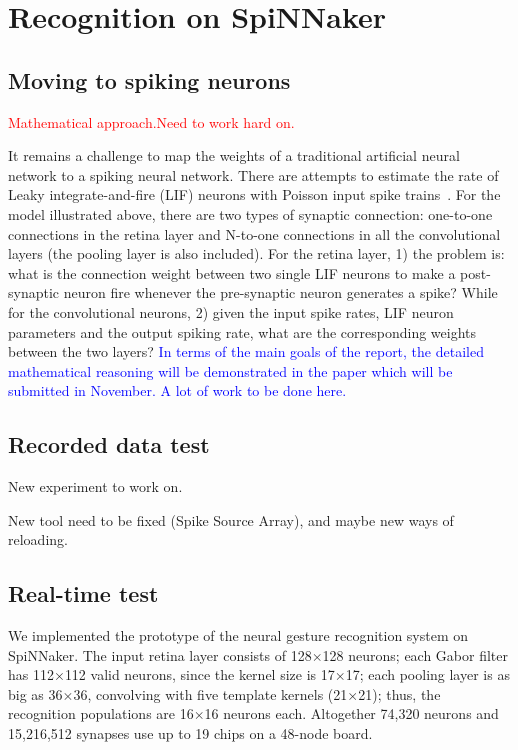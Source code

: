 \chapter{Recognition on SpiNNaker}
\label{cha:rsp}

\section{Moving to spiking neurons}
\label{sec:msn}
\textcolor{red}{Mathematical approach.Need to work hard on.}

It remains a challenge to map the weights of a traditional artificial neural network to a spiking neural network. 
There are attempts to estimate the rate of Leaky integrate-and-fire (LIF) neurons with Poisson input spike trains~\cite{la2008response}. 
For the model illustrated above, there are two types of synaptic connection: one-to-one connections in the retina layer and N-to-one connections in all the convolutional layers (the pooling layer is also included). 
For the retina layer, 1) the problem is: what is the connection weight between two single LIF neurons to make a post-synaptic neuron fire whenever the pre-synaptic neuron generates a spike? 
While for the convolutional neurons, 2) given the input spike rates, LIF neuron parameters and the output spiking rate, what are the corresponding weights between the two layers?
\textcolor{blue}{In terms of the main goals of the report, the detailed mathematical reasoning will be demonstrated in the paper which will be submitted in November. 
A lot of work to be done here.}


\section{Recorded data test}
\label{sec:rdt}
New experiment to work on.

New tool need to be fixed (Spike Source Array), and maybe new ways of reloading.

\section{Real-time test}
\label{sec:rtt}
We implemented the prototype of the neural gesture recognition system on SpiNNaker. 
The input retina layer consists of 128$\times$128 neurons; 
each Gabor filter has 112$\times$112 valid neurons, since the kernel size is 17$\times$17; 
each pooling layer is as big as 36$\times$36, convolving with five template kernels (21$\times$21); 
thus, the recognition populations are 16$\times$16 neurons each. Altogether 74,320 neurons and 15,216,512 synapses use up to 19 chips on a 48-node board.

